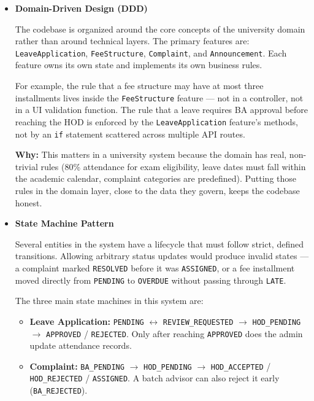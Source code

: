 \begin{itemize}
    \item \textbf{Domain-Driven Design (DDD)}

The codebase is organized around the core concepts of the university domain rather than around technical layers. The primary features are: \texttt{LeaveApplication}, \texttt{FeeStructure}, \texttt{Complaint}, and \texttt{Announcement}. Each feature owns its own state and implements its own business rules.

For example, the rule that a fee structure may have at most three installments lives inside the \texttt{FeeStructure} feature — not in a controller, not in a UI validation function. The rule that a leave requires BA approval before reaching
the HOD is enforced by the \texttt{LeaveApplication} feature's methods, not by an \texttt{if} statement scattered across multiple API routes.

\textbf{Why:} This matters in a university system because the domain has real, non-trivial rules (80\% attendance for exam eligibility, leave dates must fall within the academic calendar, complaint categories are predefined). Putting those rules in the domain layer, close to the data they govern, keeps the codebase honest.

    \item \textbf{State Machine Pattern}

    Several entities in the system have a lifecycle that must follow strict, defined
    transitions. Allowing arbitrary status updates would produce invalid states — a
    complaint marked \texttt{RESOLVED} before it was \texttt{ASSIGNED}, or a fee
    installment moved directly from \texttt{PENDING} to \texttt{OVERDUE} without passing
    through \texttt{LATE}.

    The three main state machines in this system are:

    \begin{itemize}
      \item \textbf{Leave Application:} \texttt{PENDING} $\leftrightarrow$ \texttt{REVIEW\_REQUESTED} $\to$ \texttt{HOD\_PENDING} $\to$
            \texttt{APPROVED} / \texttt{REJECTED}.
            Only after reaching \texttt{APPROVED} does the admin update attendance
            records.

      \item \textbf{Complaint:} \texttt{BA\_PENDING} $\to$ \texttt{HOD\_PENDING} $\to$
            \texttt{HOD\_ACCEPTED} / \texttt{HOD\_REJECTED} / \texttt{ASSIGNED}.
            A batch advisor can also reject it early (\texttt{BA\_REJECTED}).


\end{itemize}
\end{itemize}
